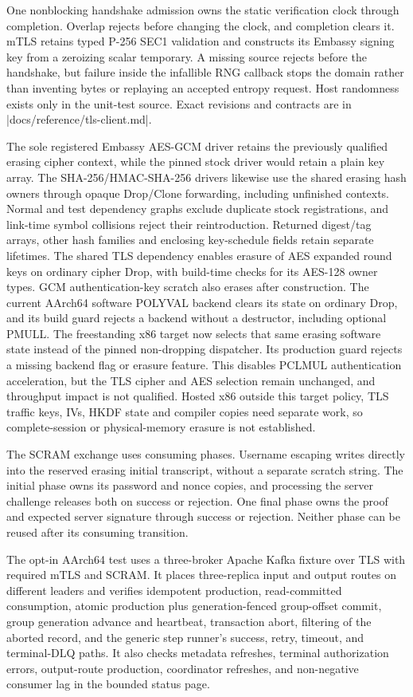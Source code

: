 One nonblocking handshake admission owns the static verification clock through
completion. Overlap rejects before changing the clock, and completion clears
it. mTLS retains typed P-256 SEC1 validation and constructs its Embassy signing
key from a zeroizing scalar temporary. A missing source rejects before the
handshake, but failure inside the infallible RNG callback stops the domain rather
than inventing bytes or replaying an accepted entropy request. Host randomness
exists only in the unit-test source. Exact revisions and contracts are in
\repofile|docs/reference/tls-client.md|.

The sole registered Embassy AES-GCM driver retains the previously qualified
erasing cipher context, while the pinned stock driver would retain a plain key array.
The SHA-256/HMAC-SHA-256 drivers likewise use the shared erasing hash owners
through opaque Drop/Clone forwarding, including unfinished contexts. Normal and
test dependency graphs exclude duplicate stock registrations, and link-time symbol
collisions reject their reintroduction. Returned digest/tag arrays, other hash
families and enclosing key-schedule fields retain separate lifetimes.
The shared TLS dependency enables erasure of AES expanded round keys on
ordinary cipher Drop, with build-time checks for its AES-128 owner types.
GCM authentication-key scratch also erases after construction. The current
AArch64 software POLYVAL backend clears its state on ordinary Drop, and its build
guard rejects a backend without a destructor, including optional PMULL. The
freestanding x86 target now selects that same erasing software state instead of
the pinned non-dropping dispatcher. Its production guard rejects a missing
backend flag or erasure feature. This disables PCLMUL authentication acceleration, but
the TLS cipher and AES selection remain unchanged, and throughput impact is not
qualified. Hosted x86 outside this target policy, TLS traffic keys, IVs, HKDF
state and compiler copies need separate work, so complete-session or physical-memory
erasure is not established.

The SCRAM exchange uses consuming phases. Username escaping writes directly into
the reserved erasing initial transcript, without a separate scratch string. The
initial phase owns its password and nonce copies, and processing the server challenge
releases both on success or rejection. One final phase owns the proof and
expected server signature through success or rejection. Neither phase can
be reused after its consuming transition.

The opt-in AArch64 test uses a three-broker Apache Kafka fixture over TLS with
required mTLS and SCRAM. It places three-replica input and output routes on
different leaders and verifies idempotent production, read-committed
consumption, atomic production plus
generation-fenced group-offset commit, group generation advance and heartbeat,
transaction abort, filtering of the aborted record, and
the generic step runner's success, retry, timeout, and terminal-DLQ paths. It
also checks metadata refreshes, terminal authorization errors, output-route
production, coordinator refreshes, and non-negative consumer lag in the
bounded status page.

